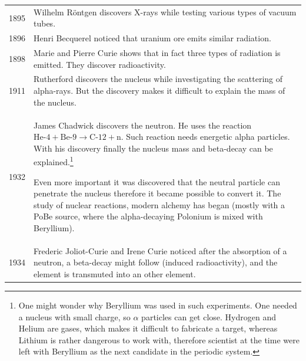 \begin{tabularx}{\textwidth}{c | X}
1895 & Wilhelm R\"ontgen discovers X-rays  while testing various types of vacuum tubes. \\
1896 & Henri  Becquerel noticed that uranium ore emits similar radiation. \\
1898 & Marie and Pierre Curie shows that in fact three types of radiation is emitted. They discover radioactivity. \\
1911 & Rutherford discovers the nucleus while investigating the scattering of alpha-rays. But the discovery makes it difficult to explain the mass of the nucleus. \\
1932 & James Chadwick discovers the neutron. He uses the reaction $\text{He-4} + \text{Be-9} \rightarrow \text{C-12} + \text{n}$. Such reaction needs energetic alpha particles. With his discovery finally the nucleus mass and beta-decay can be explained.\footnote{One might wonder why Beryllium was used in such experiments. One needed a nucleus with small charge, so $\alpha$ particles can get close. Hydrogen and Helium are gases, which makes it difficult to fabricate a target, whereas Lithium is rather dangerous to work with, therefore scientist at the time were left with Beryllium as the next candidate in the periodic system.}
 
Even more important it was discovered that the neutral particle can penetrate the nucleus therefore it became possible to convert it.  The study of nuclear reactions, modern alchemy has began (mostly with a PoBe source, where the alpha-decaying Polonium is mixed with Beryllium). \\
1934 & Frederic Joliot-Curie and Irene Curie noticed after the absorption of a neutron, a beta-decay might follow (induced radioactivity), and the element is transmuted into an other element. 
\end{tabularx}

